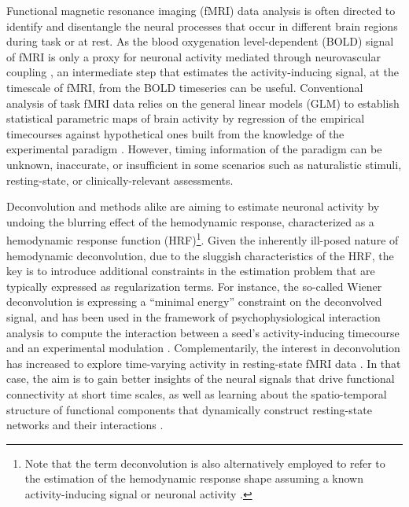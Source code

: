 Functional magnetic resonance imaging (fMRI) data analysis is often directed to
identify and disentangle the neural processes that occur in different brain
regions during task or at rest. As the blood oxygenation level-dependent (BOLD)
signal of fMRI \citep{Ogawa1990Brainmagneticresonance} is only a proxy for
neuronal activity mediated through neurovascular coupling
\citep{Logothetis2001Neurophysiologicalinvestigationbasis}, an intermediate step
that estimates the activity-inducing signal, at the timescale of fMRI, from the
BOLD timeseries can be useful. Conventional analysis of task fMRI data relies on
the general linear models (GLM) to establish statistical parametric maps of
brain activity by regression of the empirical timecourses against hypothetical
ones built from the knowledge of the experimental paradigm
\citep{Boynton1996LinearSystemsAnalysis,Cohen1997ParametricAnalysisfMRI,Friston1998EventRelatedfMRI,Friston2008DEMvariationaltreatment}.
However, timing information of the paradigm can be unknown, inaccurate, or
insufficient in some scenarios such as naturalistic stimuli, resting-state, or
clinically-relevant assessments.

Deconvolution and methods alike are aiming to estimate neuronal activity by
undoing the blurring effect of the hemodynamic response, characterized as a
hemodynamic response function (HRF)\footnote{Note that the term deconvolution is
also alternatively employed to refer to the estimation of the hemodynamic
response shape assuming a known activity-inducing signal or neuronal activity
\citep{Goutte2000Modelinghaemodynamicresponse,Marrelec2002Bayesianestimationhemodynamic,
Ciuciu2003Unsupervisedrobustnonparametric,Casanova2008impacttemporalregularization}.
}. Given the inherently ill-posed nature of hemodynamic deconvolution, due to
the sluggish characteristics of the HRF, the key is to introduce
additional constraints in the estimation problem that are typically expressed as
regularization terms. For instance, the so-called Wiener deconvolution is
expressing a \enquote{minimal energy} constraint on the deconvolved signal, and
has been used in the framework of psychophysiological interaction analysis to
compute the interaction between a seed's activity-inducing timecourse and an
experimental modulation
\citep{Glover1999DeconvolutionImpulseResponse,Gitelman2003Modelingregionalpsychophysiologic,
Gerchen2014Analyzingtaskdependent,Di2018TaskConnectomicsExamining,
Freitas2020Timeresolvedeffective}. Complementarily, the interest in
deconvolution has increased to explore time-varying activity in resting-state
fMRI data
\citep{Preti2017dynamicfunctionalconnectome,Keilholz2017TimeResolvedResting,
Lurie2020Questionscontroversiesstudy,Bolton2020TappingMultiFaceted}. In that
case, the aim is to gain better insights of the neural signals that drive
functional connectivity at short time scales, as well as learning about the
spatio-temporal structure of functional components that dynamically construct
resting-state networks and their interactions
\citep{Karahanoglu2017Dynamicslargescale}.

